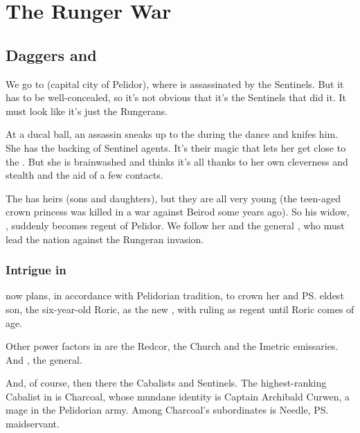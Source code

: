 \section{The Runger War}
\subsection{Daggers and \Daemons}
We go to \Malcur (capital city of Pelidor), where \rayuth[\Icor] is assassinated by the Sentinels. 
But it has to be well-concealed, so it's not obvious that it's the Sentinels that did it. 
It must look like it's just the Rungerans. 

At a ducal ball, an assassin sneaks up to the \rayuth during the dance and knifes him. She has the backing of Sentinel agents. It's their magic that lets her get close to the \rayuth. But she is brainwashed and thinks it's all thanks to her own cleverness and stealth and the aid of a few contacts. 

The \rayuth has heirs (sons and daughters), but they are all very young (the teen-aged crown princess was killed in a war against Beirod some years ago). 
So his widow, \rinyuth[\Tiroco], suddenly becomes regent of Pelidor. 
We follow her and the general , who must lead the nation against the Rungeran invasion. 






\subsubsection{Intrigue in \Malcur}
\Tiroco{} now plans, in accordance with Pelidorian tradition, to crown her and \ps{\Icor} eldest son, the six-year-old Roric, as the new \rayuth, with \Tiroco{} ruling as regent until Roric comes of age. 

Other power factors in \Malcur are the Redcor, the \Telcra{} Church and the Imetric emissaries. 
And , the general. 

And, of course, then there the Cabalists and Sentinels. 
The highest-ranking Cabalist in \Malcur is Charcoal, whose mundane identity is Captain Archibald Curwen, a mage in the Pelidorian army. 
Among Charcoal's subordinates is Needle, \ps{\Tiroco} maidservant. 






